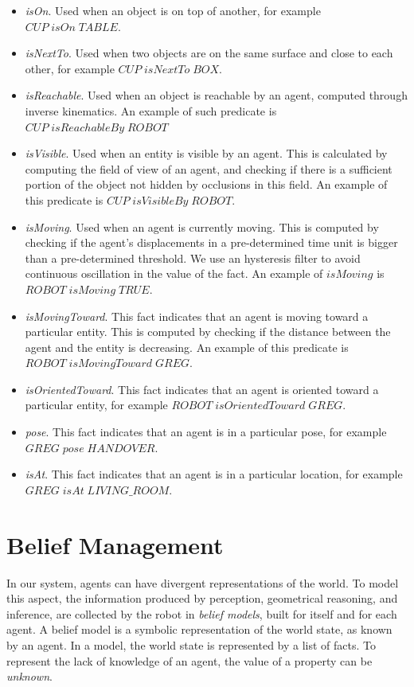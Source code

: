 \begin{itemize}
\item \textit{isOn}. Used when an object is on top of another, for example $CUP\; isOn\; TABLE$.
\item \textit{isNextTo}. Used when two objects are on the same surface and close to each other, for example $CUP\; isNextTo\; BOX$.
\item \textit{isReachable}. Used when an object is reachable by an agent, computed through inverse kinematics. An example of such predicate is $CUP\; isReachableBy\; ROBOT$
\item \textit{isVisible}. Used when an entity is visible by an agent. This is calculated by computing the field of view of an agent, and checking if there is a sufficient portion of the object not hidden by occlusions in this field. An example of this predicate is $CUP\; isVisibleBy\; ROBOT$.
\item \textit{isMoving}. Used when an agent is currently moving. This is computed by checking if the agent's displacements in a pre-determined time unit is bigger than a pre-determined threshold. We use an hysteresis filter to avoid continuous oscillation in the value of the fact. An example of $isMoving$ is $ROBOT\; isMoving\; TRUE$.
\item \textit{isMovingToward}. This fact indicates that an agent is moving toward a particular entity. This is computed by checking if the distance between the agent and the entity is decreasing. An example of this predicate is $ROBOT\; isMovingToward\; GREG$.
\item \textit{isOrientedToward}. This fact indicates that an agent is oriented toward a particular entity, for example $ROBOT\; isOrientedToward\; GREG$.
\item \textit{pose}. This fact indicates that an agent is in a particular pose, for example $GREG\; pose\; HANDOVER$.
\item \textit{isAt}. This fact indicates that an agent is in a particular location, for example $GREG\; isAt\; LIVING\_ROOM$.
\end{itemize}


\section{Belief Management}
\label{sec:situation_assessment-belief_management}
In our system, agents can have divergent representations of the world. To model this aspect, the information produced by perception, geometrical reasoning, and inference, are collected by the robot in \textit{belief models}, built for itself and for each agent. A belief model is a symbolic representation of the world state, as known by an agent. In a model, the world state is represented by a list of facts. To represent the lack of knowledge of an agent, the value of a property can be \textit{unknown}.

